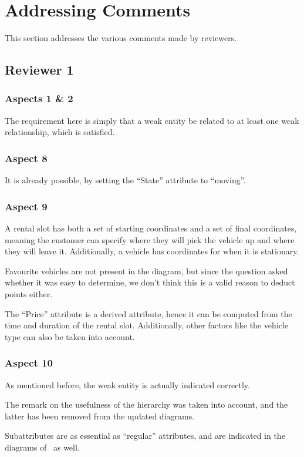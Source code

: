 \documentclass[journal, 9pt]{IEEEtran}
\theoremstyle{definition}
\begin{document}
\section{Addressing Comments}
This section addresses the various comments made by reviewers.
\subsection{Reviewer 1}
\subsubsection{Aspects 1 \& 2}
The requirement here is simply that a weak entity be related to at least one weak relationship, which is satisfied.

\subsubsection{Aspect 8}
It is already possible, by setting the ``State'' attribute to ``moving''.

\subsubsection{Aspect 9}
A rental slot has both a set of starting coordinates and a set of final coordinates, meaning the customer can specify where they will pick the vehicle up and where they will leave it.
Additionally, a vehicle has coordinates for when it is stationary.

Favourite vehicles are not present in the diagram, but since the question asked whether it was easy to determine, we don't think this is a valid reason to deduct points either.

The ``Price'' attribute is a derived attribute, hence it can be computed from the time and duration of the rental slot.
Additionally, other factors like the vehicle type can also be taken into account.

\subsubsection{Aspect 10}
As mentioned before, the weak entity is actually indicated correctly.

The remark on the usefulness of the hierarchy was taken into account, and the latter has been removed from the updated diagrams.

Subattributes are as essential as ``regular'' attributes, and are indicated in the diagrams of~\cite{db} as well.
\end{document}
